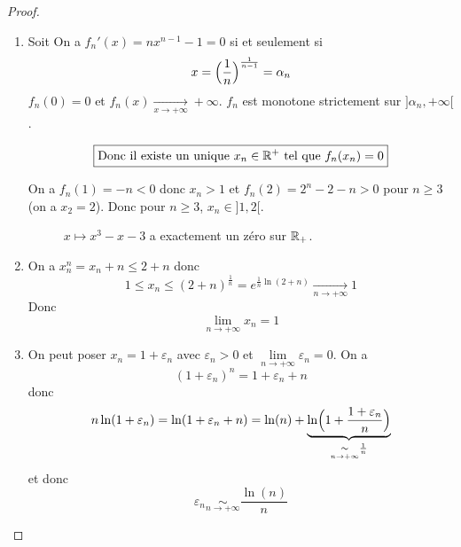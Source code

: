 \begin{proof}
	\phantom{}
	\begin{enumerate}
		\item Soit 
		On a $f_{n}'(x)=nx^{n-1}-1=0$ si et seulement si 
		$$x=\Bigl(\frac{1}{n}\Bigr)^{\frac{1}{n-1}}=\alpha_{n}$$
		$f_{n}(0)=0$ et $f_{n}(x)\xrightarrow[x\to+\infty]{}+\infty$.
		$f_{n}$ est monotone strictement sur $]\alpha_{n},+\infty[$.
		
		$$\boxed{\text{Donc il existe un unique }x_{n}\in\mathbb{R}^{+}\text{ tel que }f_{n}(x_{n})=0}$$

		On a $f_{n}(1)=-n<0$ donc $x_{n}>1$ et $f_{n}(2)=2^{n}-2-n>0$ pour $n\geqslant3$ (on a $x_{2}=2$). Donc pour $n\geqslant3$, $x_{n}\in]1,2[$.

		\begin{figure}[!ht]
			\centering
			\caption{$x\mapsto x^{3}-x-3$ a exactement un zéro sur $\mathbb{R}_{+}$.}
		\end{figure}

		\item On a $x_{n}^{n}=x_{n}+n\leqslant2+n$ donc 
		$$1\leqslant x_{n}\leqslant(2+n)^{\frac{1}{n}}=e^{\frac{1}{n}\ln(2+n)}\xrightarrow[n\to+\infty]{}1$$
		Donc 
		$$\boxed{\lim\limits_{n\to+\infty}x_{n}=1}$$

		\item On peut poser $x_{n}=1+\varepsilon_{n}$ avec $\varepsilon_{n}>0$ et $\lim\limits_{n\to+\infty}\varepsilon_{n}=0$. On a 
		$$(1+\varepsilon_{n})^{n}=1+\varepsilon_{n}+n$$
		donc 
		$$n\ln(1+\varepsilon_{n})=\ln(1+\varepsilon_{n}+n)=\ln(n)+\underbrace{\ln\Bigl(1+\frac{1+\varepsilon_{n}}{n}\Bigr)}_{\underset{n\to+\infty}{\sim}\frac{1}{n}}$$
		et donc 
		$$\varepsilon_{n}\underset{n\to+\infty}{\sim}\frac{\ln(n)}{n}$$


\end{enumerate}
\end{proof}

